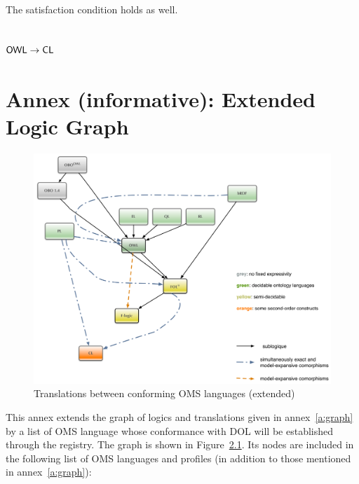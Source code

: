 \documentclass[10pt,fleqn,%
\ifpretendfinal
final%
\else
draft%
\fi,
]{scrreprt}
\newcommand*{\CL}{\ensuremath{\mathsf{CL}}\xspace}
\newcommand{\annexrefname}{annex}
\newcommand{\figurerefname}{Figure}
\newcommand{\aref}[1]{\annexrefname~\ref{#1}}
\newcommand{\fref}[1]{\figurerefname~\ref{#1}}
\newcommand{\sclause}[1]{\section{#1}}
\newcommand{\infannex}[1]{ \chapter{Annex (informative): #1} }
\begin{document}
	The satisfaction condition holds as well.

\sclause{$\OWL \rightarrow \CL$}


\infannex{Extended Logic Graph}\label{a:ext-graph}

\begin{figure}
  \centering
  \includegraphics[width=\textwidth]{illustrations/pre-reduced-ontograph}
  \caption{Translations between conforming OMS languages (extended)}
  \label{fig:pre-ontograph}
\end{figure}
This annex extends the graph of logics and translations given in
\aref{a:graph} by a list of OMS language whose conformance with
DOL will be established through the registry.  The graph is shown in
\fref{fig:pre-ontograph}.  Its nodes are included in the following
list of OMS languages and profiles (in addition to those
mentioned in \aref{a:graph}):
\end{document}
